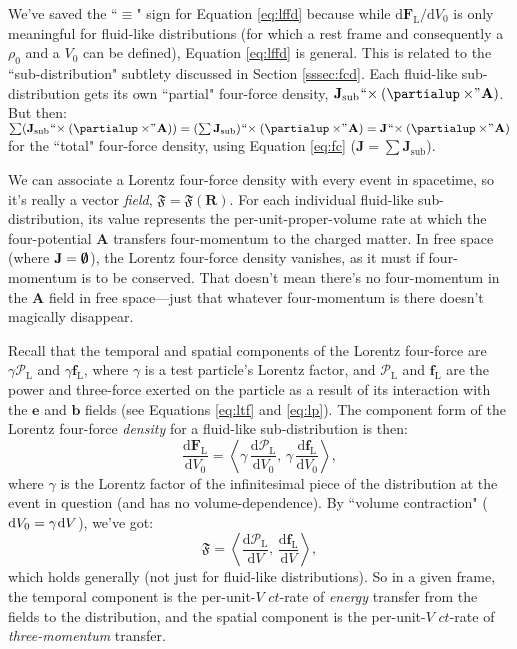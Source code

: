 \documentclass[12pt]{article}
\renewcommand{\vv}[1]{\mathbf{#1}}
\newcommand{\dd}[1]{\mathrm{d}#1}
\begin{document}
We've saved the ``$\equiv$" sign for Equation \ref{eq:lffd} because while $\dd \vv F_{\mathrm{L}} / \dd V_0$ is only meaningful for fluid-like distributions (for which a rest frame and consequently a $\rho_0$ and a $V_0$ can be defined), Equation \ref{eq:lffd} is general. This is related to the ``sub-distribution" subtlety discussed in Section \ref{sssec:fcd}. Each fluid-like sub-distribution gets its own ``partial" four-force density, ${\vv J_{\mathrm{sub}} \mkern1mu `` \mkern-4mu \times (\partialup \times \mkern-4mu " \mkern1mu \vv A)}$. But then: ${ \sum ( \vv J_{\mathrm{sub}} \mkern1mu `` \mkern-4mu \times (\partialup \times \mkern-4mu " \mkern1mu \vv A) ) = (\sum \vv J_{\mathrm{sub}}) \mkern1mu `` \mkern-4mu \times (\partialup \times \mkern-4mu " \mkern1mu \vv A) = \vv J \mkern1mu `` \mkern-4mu \times (\partialup \times \mkern-4mu " \mkern1mu \vv A)}$ for the ``total" four-force density, using Equation \ref{eq:fc} ($\vv J = \sum \vv J_{\mathrm{sub}}$).

We can associate a Lorentz four-force density with every event in spacetime, so it's really a vector \emph{field}, $\bm{\mathfrak{F}} = \bm{\mathfrak{F}} (\vv R)$. For each individual fluid-like sub-distribution, its value represents the per-unit-proper-volume rate at which the four-potential $\vv A$ transfers four-momentum to the charged matter. In free space (where $\vv J = \textrm{\mbox{\boldmath $\emptyset$}}$), the Lorentz four-force density vanishes, as it must if four-momentum is to be conserved. That doesn't mean there's no four-momentum in the $\vv A$ field in free space---just that whatever four-momentum is there doesn't magically disappear.

Recall that the temporal and spatial components of the Lorentz four-force are $\gamma \mathcal{P}_{\mathrm{L}}$ and $\gamma \vv f_{\textrm{L}}$, where $\gamma$ is a test particle's Lorentz factor, and $\mathcal{P}_{\mathrm{L}}$ and $\vv f_{\textrm{L}}$ are the power and three-force exerted on the particle as a result of its interaction with the $\vv e$ and $\vv b$ fields (see Equations \ref{eq:ltf} and \ref{eq:lp}). The component form of the Lorentz four-force \emph{density} for a fluid-like sub-distribution is then:
\begin{equation*}
\dfrac{\dd \vv F_{\mathrm{L}}}{\dd V_0} = \left \langle \gamma \, \dfrac{\dd \mathcal{P}_{\textrm{L}} }{\dd V_0}, \, \gamma \, \dfrac{\dd \vv f_{\textrm{L}}}{\dd V_0} \right \rangle,
\end{equation*}
where $\gamma$ is the Lorentz factor of the infinitesimal piece of the distribution at the event in question (and has no volume-dependence). By ``volume contraction" ($\dd V_0 = \gamma \mkern1mu \dd V$), we've got:
\begin{equation}\label{eq:lffdc}
\bm{\mathfrak{F}} = \left \langle \dfrac{\dd \mathcal{P}_{\mathrm{L}}}{\dd V}, \, \dfrac{\dd \vv f_{\mathrm{L}}}{\dd V} \right \rangle ,
\end{equation}
which holds generally (not just for fluid-like distributions). So in a given frame, the temporal component is the per-unit-$V$ $ct$-rate of \emph{energy} transfer from the fields to the distribution, and the spatial component is the per-unit-$V$ $ct$-rate of \emph{three-momentum} transfer.
\end{document}
